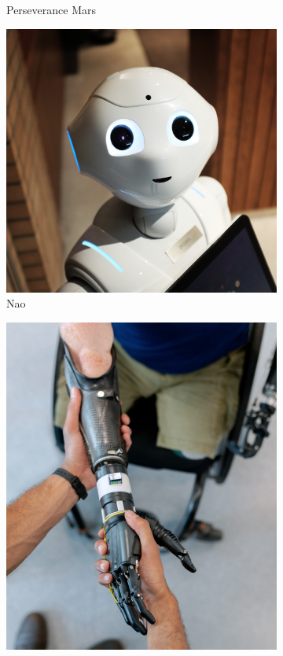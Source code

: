 \begin{figure}[h]
\begin{subfigure}[b]{0.25\textwidth}
    \caption{Perseverance Mars}
    \label{fig:f2}
  \end{subfigure}
  \hfill
   \begin{subfigure}[b]{0.25\textwidth}
    \includegraphics[width=\textwidth, height=\textwidth]{chapters/images/nao.png}
    \caption{Nao}
    \label{fig:f3}
  \end{subfigure}
  \hfill
   \begin{subfigure}[b]{0.25\textwidth}
    \includegraphics[width=\textwidth, height=\textwidth]{chapters/images/brazo.png}

\end{subfigure}
\end{figure}
